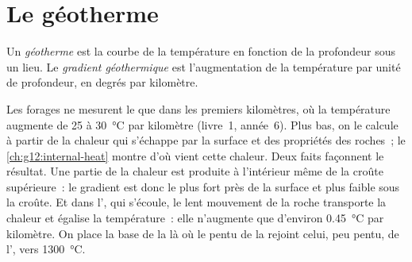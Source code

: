 \section{Le géotherme}

\begin{definition}\label{def:g11:lithosphere-asthenosphere:geotherm}
Un \emph{géotherme} est la courbe de la
température en fonction de la profondeur sous un lieu. Le \emph{gradient
géothermique} est
l'augmentation de la température par unité de profondeur, en degrés par
kilomètre.
\end{definition}

Les forages ne mesurent le  que dans les premiers kilomètres, où la
température augmente de 25 à \qty{30}{\celsius} par kilomètre (livre~1,
année~6). Plus bas, on le calcule à partir de la chaleur qui s'échappe par la
surface et des propriétés des roches~; le \cref{ch:g12:internal-heat} montre
d'où vient cette chaleur. Deux faits façonnent le résultat. Une partie de la
chaleur est produite à l'intérieur même de la croûte supérieure~: le
gradient est donc le plus fort près de la surface et plus faible sous la
croûte. Et dans l', qui s'écoule, le lent mouvement de la roche
transporte la chaleur et égalise la température~: elle n'augmente que
d'environ \qty{0.45}{\celsius} par kilomètre. On place la base de la
 là où le  pentu de la  rejoint celui, peu
pentu, de l', vers \qty{1300}{\celsius}.

